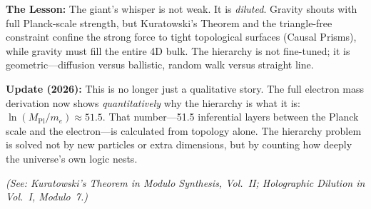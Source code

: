 \documentclass[11pt, a4paper, openany]{book}
\begin{document}
\begin{thoughtexp}
\textbf{The Lesson:} The giant's whisper is not weak. It is \emph{diluted}. Gravity shouts with full Planck-scale strength, but Kuratowski's Theorem and the triangle-free constraint confine the strong force to tight topological surfaces (Causal Prisms), while gravity must fill the entire 4D bulk. The hierarchy is not fine-tuned; it is geometric---diffusion versus ballistic, random walk versus straight line.

\textbf{Update (2026):} This is no longer just a qualitative story. The full electron mass derivation now shows \emph{quantitatively} why the hierarchy is what it is: $\ln(M_{\mathrm{Pl}}/m_e) \approx 51.5$. That number---51.5 inferential layers between the Planck scale and the electron---is calculated from topology alone. The hierarchy problem is solved not by new particles or extra dimensions, but by counting how deeply the universe's own logic nests.

\textit{(See: Kuratowski's Theorem in Modulo Synthesis, Vol.~II; Holographic Dilution in Vol.~I, Modulo~7.)}
\end{thoughtexp}
\end{document}
